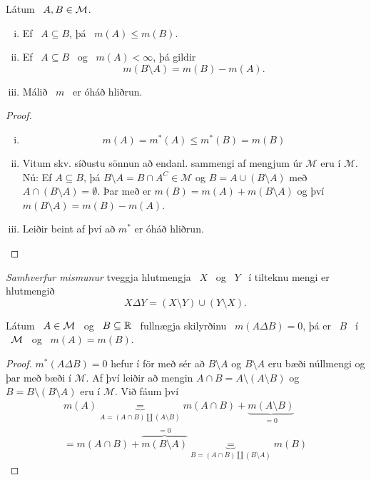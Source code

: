 \documentclass[12pt]{report}
\newcommand{\cM}{\mathcal{M}}
\newcommand{\M}{{\cal M}}
\begin{document}
    \begin{setn*}
    Látum \ $A,B\in\M$.
    \begin{enumerate}[(i)]
    \item
    Ef \ $A\subseteq B$, þá \ $m(A) \leq m(B)$.
    \item
    Ef \ $A\subseteq B$ \ og \ $m(A) < \infty$, þá gildir 
    \[
    m(B\setminus A) = m(B) - m(A).
    \]
    \item
    Málið \ $m$ \ er óháð hliðrun.
    \end{enumerate}
    \end{setn*}
    \begin{proof}
      \begin{enumerate}[(i)]
      \item \[ m(A) = m^*(A) \leq m^*(B) = m(B) \]
      \item Vitum skv. síðustu sönnun að endanl. sammengi af
        mengjum úr $\cM$ eru í $\cM$.  Nú: Ef $A \subseteq B$,
        þá $B \setminus A = B \cap A^C \in \cM$ og
        $B = A \cup (B \setminus A)$ með
        $A \cap (B \setminus A) = \emptyset$.  Þar með er
        $m(B) = m(A) + m(B \setminus A)$ og því
        $m(B \setminus A) = m(B) - m(A)$.

      \item Leiðir beint af því að $m^*$ er óháð hliðrun.
      \end{enumerate}
    \end{proof}
    
    \begin{ath}[Upprifjun]
    {\em Samhverfur mismunur} tveggja hlutmengja \ $X$ \ og \ $Y$ \ í tilteknu mengi er hlutmengið
\[
X\Delta Y = (X\setminus Y)\cup(Y\setminus X).
\]
\end{ath}

    \begin{setn*}
    Látum \ $A\in\M$ \ og \ $B\subseteq \mathbb{R}$ \ fullnægja skilyrðinu \ $m(A\Delta B) = 0$, þá er \ $B$ \ í \ $\M$ \ og \ $m(A) = m(B)$.
    \end{setn*}
    \begin{proof}
      $m^*(A \Delta B) = 0$ hefur í för með sér að
      $B \setminus A$ og $B \setminus A$ eru bæði núllmengi og
      þar með bæði í $\cM$. Af því leiðir að mengin
      $ A \cap B = A \setminus (A \setminus B) $ og
      $B = B \setminus (B \setminus A)$ eru í $\cM$.  Við fáum
      því
      \begin{gather*}
        m(A) \underbrace{=}_{A = (A \cap B) \amalg (A
          \setminus B)} m( A \cap
        B) + \underbrace{m(A \setminus B)}_{= 0}\\
        = m(A \cap B) + \overbrace{m(B \setminus A)}^{= 0}
        \underbrace{=}_{B = (A \cap B) \amalg (B \setminus A)}
        m(B)
      \end{gather*}
    \end{proof}
\end{document}
